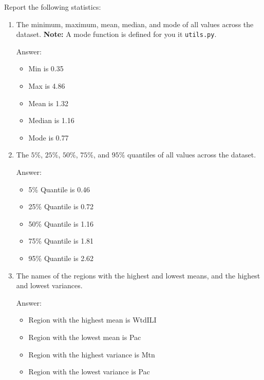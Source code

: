 \documentclass{article}
\newcommand{\blu}[1]{{\textcolor{blu}{#1}}}
\newenvironment{answer}{\par\begingroup\color{gre}Answer: }{\endgroup}
\let\ask\blu
\begin{document}
  \ask{Report the following statistics}:
  \begin{enumerate}
  \item The minimum, maximum, mean, median, and mode of all values across the dataset. \textbf{Note:} A mode function is defined for you it \texttt{utils.py}. 
  \begin{answer}
    \begin{itemize}
        \item   Min is 0.35
        \item   Max is 4.86
        \item   Mean is 1.32
        \item   Median is 1.16
        \item   Mode is 0.77
    \end{itemize}
          \end{answer}
  \item The $5\%$, $25\%$, $50\%$, $75\%$, and $95\%$ quantiles of all values across the dataset.
  \begin{answer}
    \begin{itemize}
        \item  5\% Quantile is 0.46
        \item  25\% Quantile is 0.72
        \item  50\% Quantile is 1.16
        \item 75\% Quantile is 1.81
        \item 95\% Quantile is 2.62
    \end{itemize}
  \end{answer}
  \item The names of the regions with the highest and lowest means, and the highest and lowest variances.
  \begin{answer}
      \begin{itemize}
        \item Region with the highest mean is WtdILI
        \item Region with the lowest mean is Pac
        \item Region with the highest variance is Mtn
        \item Region with the lowest variance is Pac
      \end{itemize}
  \end{answer}
  \end{enumerate}
\end{document}
